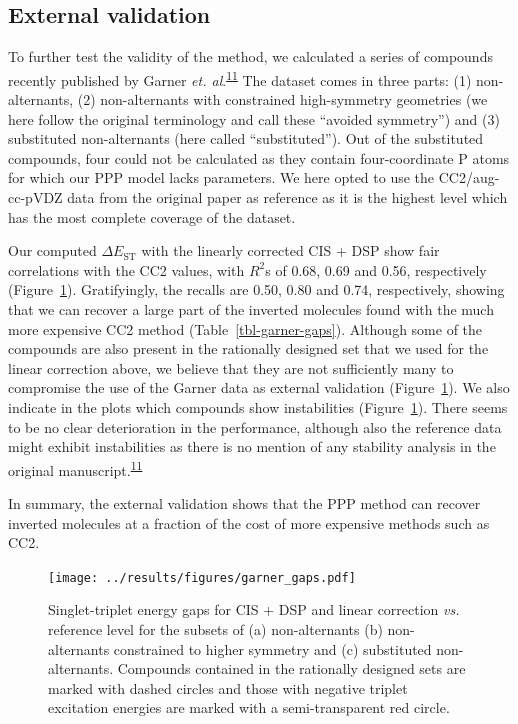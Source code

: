 \documentclass[
  number,
  3p]{elsarticle}
\newcommand{\DeltaE}[2][]{\Delta E^{\mathrm{#1}}_{\mathrm{#2}}}
\begin{document}
\hypertarget{external-validation}{%
\subsection{External validation}\label{external-validation}}

To further test the validity of the method, we calculated a series of
compounds recently published by Garner \emph{et.
al}.\textsuperscript{\protect\hyperlink{ref-garnerDoublebondDelocalizationNonalternant2023}{11}}
The dataset comes in three parts: (1) non-alternants, (2) non-alternants
with constrained high-symmetry geometries (we here follow the original
terminology and call these ``avoided symmetry'') and (3) substituted
non-alternants (here called ``substituted''). Out of the substituted
compounds, four could not be calculated as they contain four-coordinate
P atoms for which our PPP model lacks parameters. We here opted to use
the CC2/aug-cc-pVDZ data from the original paper as reference as it is
the highest level which has the most complete coverage of the dataset.

Our computed \(\DeltaE{ST}\) with the linearly corrected CIS + DSP show
fair correlations with the CC2 values, with \(R^2\)s of 0.68, 0.69 and
0.56, respectively (Figure~\ref{fig-garner-gaps}). Gratifyingly, the
recalls are 0.50, 0.80 and 0.74, respectively, showing that we can
recover a large part of the inverted molecules found with the much more
expensive CC2 method (Table~\ref{tbl-garner-gaps}). Although some of the
compounds are also present in the rationally designed set that we used
for the linear correction above, we believe that they are not
sufficiently many to compromise the use of the Garner data as external
validation (Figure~\ref{fig-garner-gaps}). We also indicate in the plots
which compounds show instabilities (Figure~\ref{fig-garner-gaps}). There
seems to be no clear deterioration in the performance, although also the
reference data might exhibit instabilities as there is no mention of any
stability analysis in the original
manuscript.\textsuperscript{\protect\hyperlink{ref-garnerDoublebondDelocalizationNonalternant2023}{11}}

In summary, the external validation shows that the PPP method can
recover inverted molecules at a fraction of the cost of more expensive
methods such as CC2.

\begin{figure}

{\centering \texttt{[image: ../results/figures/garner\_gaps.pdf]}

}

\caption{\label{fig-garner-gaps}Singlet-triplet energy gaps for CIS +
DSP and linear correction \emph{vs.} reference level for the subsets of
(a) non-alternants (b) non-alternants constrained to higher symmetry and
(c) substituted non-alternants. Compounds contained in the rationally
designed sets are marked with dashed circles and those with negative
triplet excitation energies are marked with a semi-transparent red
circle.}

\end{figure}
\end{document}
